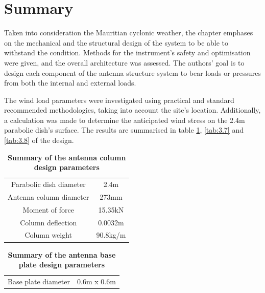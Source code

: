 {\section{Summary}

Taken into consideration the Mauritian cyclonic weather, the chapter emphases on the mechanical and the structural design of the system to be able to withstand the condition. Methods for the instrument's safety and optimisation were given, and the overall architecture was assessed. The authors' goal is to design each component of the antenna structure system to bear loads or pressures from both the internal and external loads.

The wind load parameters were investigated using practical and standard recommended methodologies, taking into account the site's location. Additionally, a calculation was made to determine the anticipated wind stress on the 2.4m parabolic dish's surface. The results are summarised in table  \ref{tab:3.6}, \ref{tab:3.7} and \ref{tab:3.8} of the design.


\begin{table}[h!]
    \centering

\caption{\textbf{Summary of the antenna column design parameters}}

\begin{tabular}{ c   c}
    \hline
 
 Parabolic dish diameter & 2.4m\\ 

 Antenna column diameter & 273mm \\

 Moment of force & 15.35kN\\


 Column deflection  &  0.0032m\\

Column weight & 90.8kg/m\\
 \hline
 
    \end{tabular}
    \label{tab:3.6}
\end{table}

\vspace{1cm}
 
 \begin{table}[h!]
    \centering
 
  \caption{\textbf{Summary of the antenna base plate design parameters}}
\begin{tabular}{ c  c}
    \hline
 Base plate diameter & 0.6m x 0.6m\\


\end{tabular}
\end{table}}
